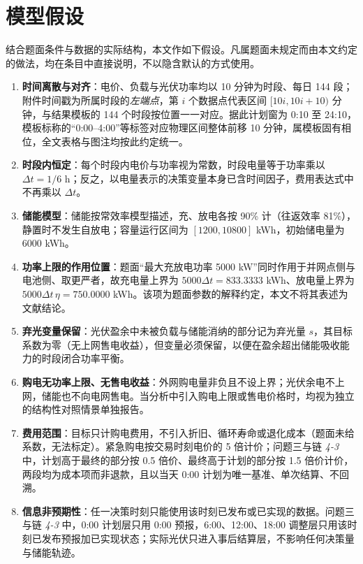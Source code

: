 \section{模型假设}

结合题面条件与数据的实际结构，本文作如下假设。凡属题面未规定而由本文约定的做法，均在条目中直接说明，不以隐含默认的方式使用。

\begin{enumerate}[leftmargin=2.4em,itemsep=2pt]
  \item \textbf{时间离散与对齐}：电价、负载与光伏功率均以 10 分钟为时段、每日 144 段；附件时间戳为所属时段的\emph{左端点}，第 $i$ 个数据点代表区间 $[10i,10i+10)$ 分钟，与结果模板的 144 个时段按位置一一对应。据此计划窗为 0:10 至 24:10，模板标称的“0:00--4:00”等标签对应物理区间整体前移 10 分钟，属模板固有相位，全文表格与图注均按此约定统一。
  \item \textbf{时段内恒定}：每个时段内电价与功率视为常数，时段电量等于功率乘以 $\Delta t=1/6$ h；反之，以电量表示的决策变量本身已含时间因子，费用表达式中不再乘以 $\Delta t$。
  \item \textbf{储能模型}：储能按常效率模型描述，充、放电各按 90\% 计（往返效率 81\%），静置时不发生自放电；容量运行区间为 $[1200,10800]$ kWh，初始储电量为 6000 kWh。
  \item \textbf{功率上限的作用位置}：题面“最大充放电功率 5000 kW”同时作用于并网点侧与电池侧、取更严者，故充电量上界为 $5000\Delta t=833.3333$ kWh、放电量上界为 $5000\Delta t\,\eta=750.0000$ kWh。该项为题面参数的解释约定，本文不将其表述为文献结论。
  \item \textbf{弃光变量保留}：光伏盈余中未被负载与储能消纳的部分记为弃光量 $s$，其目标系数为零（无上网售电收益），但变量必须保留，以便在盈余超出储能吸收能力的时段闭合功率平衡。
  \item \textbf{购电无功率上限、无售电收益}：外网购电量非负且不设上界；光伏余电不上网，储能也不向电网售电。当分析中引入购电上限或售电价格时，均视为独立的结构性对照情景单独报告。
  \item \textbf{费用范围}：目标只计购电费用，不引入折旧、循环寿命或退化成本（题面未给系数，无法标定）。紧急购电按交易时刻电价的 5 倍计价；问题三与链 \emph{4-3} 中，计划高于最终的部分按 0.5 倍价、最终高于计划的部分按 1.5 倍价计价，两段均为成本项而非退款，且以当天 0:00 计划为唯一基准、单次结算、不回溯。
  \item \textbf{信息非预期性}：任一决策时刻只能使用该时刻已发布或已实现的数据。问题三与链 \emph{4-3} 中，0:00 计划层只用 0:00 预报，6:00、12:00、18:00 调整层只用该时刻已发布预报加已实现状态；实际光伏只进入事后结算层，不影响任何决策量与储能轨迹。

\end{enumerate}
